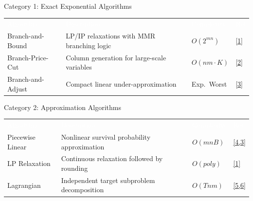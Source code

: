 \documentclass[aspectratio=169,10pt]{beamer}
\begin{document}
\begin{frame}{Category 1: Exact Exponential Algorithms}


  \vspace{0.4cm}
  \begin{center}
  \small
  \begin{tabular}{lp{4cm}lp{1cm}}
    \rowcolor{DarkSlate}
    \textcolor{white}{Algorithm} & \textcolor{white}{Description} & \textcolor{white}{Complexity} & \textcolor{white}{Ref} \\
    Branch-and-Bound & LP/IP relaxations with MMR branching logic & $O(2^{mn})$ & \hyperlink{ref1}{[1]} \\
    Branch-Price-Cut & Column generation for large-scale variables & $O(nm \cdot K)$ & \hyperlink{ref2}{[2]} \\
    Branch-and-Adjust & Compact linear under-approximation & Exp.\ Worst & \hyperlink{ref3}{[3]} \\
  \end{tabular}
  \end{center}
\end{frame}

\begin{frame}{Category 2: Approximation Algorithms}


  \vspace{0.4cm}
  \begin{center}
  \small
  \begin{tabular}{lp{4.2cm}lp{1cm}}
    \rowcolor{DarkSlate}
    \textcolor{white}{Algorithm} & \textcolor{white}{Description} & \textcolor{white}{Complexity} & \textcolor{white}{Ref} \\
    Piecewise Linear & Nonlinear survival probability approximation & $O(mnB)$ & \hyperlink{ref4}{[4,3]} \\
    LP Relaxation & Continuous relaxation followed by rounding & $O(poly)$ & \hyperlink{ref1}{[1]} \\
    Lagrangian & Independent target subproblem decomposition & $O(Tnm)$ & \hyperlink{ref5}{[5,6]} \\
  \end{tabular}
  \end{center}
\end{frame}
\end{document}
